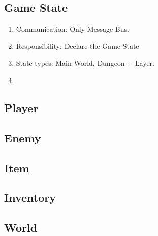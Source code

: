 \subsection{Game State}

\begin{enumerate}
  \item Communication: Only Message Bus.
  \item Responsibility: Declare the Game State
  \item State types: Main World, Dungeon + Layer.
  \item %
\end{enumerate}

\subsection{Player}

\subsection{Enemy}

\subsection{Item}

\subsection{Inventory}

\subsection{World}
